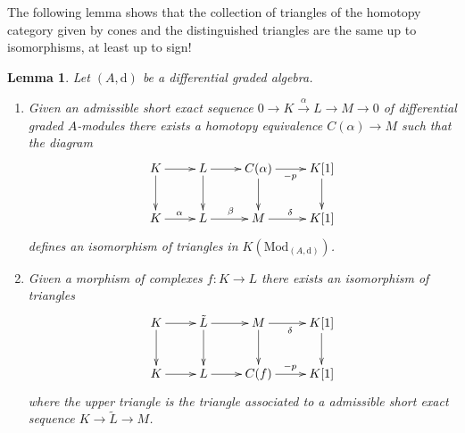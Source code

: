 \documentclass{stacks-project}
\theoremstyle{plain}
\newtheorem{lemma}[subsection]{Lemma}
\theoremstyle{definition}
\theoremstyle{remark}
\numberwithin{equation}{subsection}
\begin{document}
\noindent
The following lemma shows that the collection of triangles of the homotopy
category given by cones and the distinguished triangles are the same
up to isomorphisms, at least up to sign!

\begin{lemma}
\label{lemma-the-same-up-to-isomorphisms}
Let $(A, \text{d})$ be a differential graded algebra.
\begin{enumerate}
\item Given an admissible short exact sequence
$0 \to K \xrightarrow{\alpha} L \to M \to 0$
of differential graded $A$-modules there exists a homotopy equivalence
$C(\alpha) \to M$ such that the diagram
$$
\xymatrix{
K \ar[r] \ar[d] & L \ar[d] \ar[r] &
C(\alpha) \ar[r]_{-p} \ar[d] & K[1] \ar[d] \\
K \ar[r]^\alpha & L \ar[r]^\beta &
M \ar[r]^\delta & K[1]
}
$$
defines an isomorphism of triangles in $K(\text{Mod}_{(A, \text{d})})$.
\item Given a morphism of complexes $f : K \to L$
there exists an isomorphism of triangles
$$
\xymatrix{
K \ar[r] \ar[d] & \tilde L \ar[d] \ar[r] &
M \ar[r]_{\delta} \ar[d] & K[1] \ar[d] \\
K \ar[r] & L \ar[r] &
C(f) \ar[r]^{-p} & K[1]
}
$$
where the upper triangle is the triangle associated to a
admissible short exact sequence $K \to \tilde L \to M$.
\end{enumerate}
\end{lemma}
\end{document}
